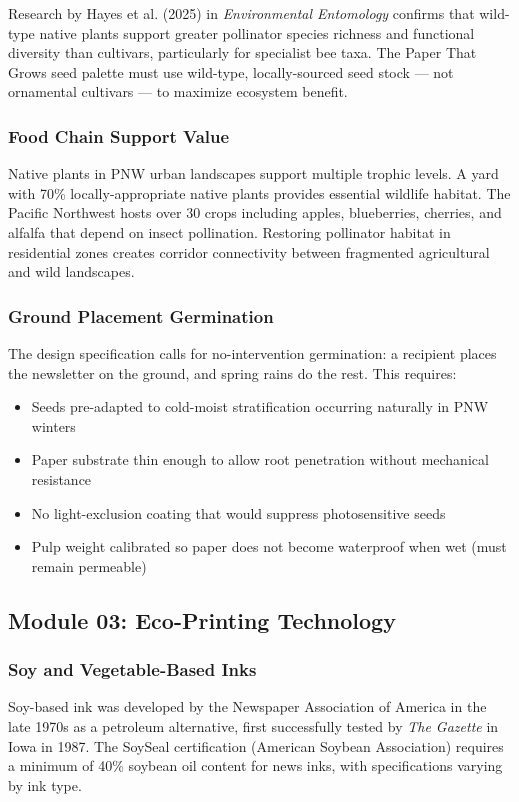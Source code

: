 \documentclass[11pt,letterpaper]{article}
\begin{document}
Research by Hayes et al. (2025) in \textit{Environmental Entomology} confirms that wild-type native plants support greater pollinator species richness and functional diversity than cultivars, particularly for specialist bee taxa. The Paper That Grows seed palette must use wild-type, locally-sourced seed stock --- not ornamental cultivars --- to maximize ecosystem benefit.

\subsubsection{Food Chain Support Value}
Native plants in PNW urban landscapes support multiple trophic levels. A yard with 70\% locally-appropriate native plants provides essential wildlife habitat. The Pacific Northwest hosts over 30 crops including apples, blueberries, cherries, and alfalfa that depend on insect pollination. Restoring pollinator habitat in residential zones creates corridor connectivity between fragmented agricultural and wild landscapes.

\subsubsection{Ground Placement Germination}
The design specification calls for no-intervention germination: a recipient places the newsletter on the ground, and spring rains do the rest. This requires:
\begin{itemize}[leftmargin=1.5em]
  \item Seeds pre-adapted to cold-moist stratification occurring naturally in PNW winters
  \item Paper substrate thin enough to allow root penetration without mechanical resistance
  \item No light-exclusion coating that would suppress photosensitive seeds
  \item Pulp weight calibrated so paper does not become waterproof when wet (must remain permeable)
\end{itemize}

\subsection{Module 03: Eco-Printing Technology}

\subsubsection{Soy and Vegetable-Based Inks}
Soy-based ink was developed by the Newspaper Association of America in the late 1970s as a petroleum alternative, first successfully tested by \textit{The Gazette} in Iowa in 1987. The SoySeal certification (American Soybean Association) requires a minimum of 40\% soybean oil content for news inks, with specifications varying by ink type.
\end{document}
